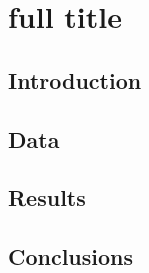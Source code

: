 
\chapter[short title]{full title}
\label{ch:paper1}

\graphicspath{{./../gfx/Paper1/}}


\begin{abstract}
    \lipsum[1]
\end{abstract}

\section{Introduction}
    \lipsum

\section{Data}
\label{ch:p1:data}
    \lipsum

\section{Results}
    \lipsum

\section{Conclusions} 
    \lipsum
	
